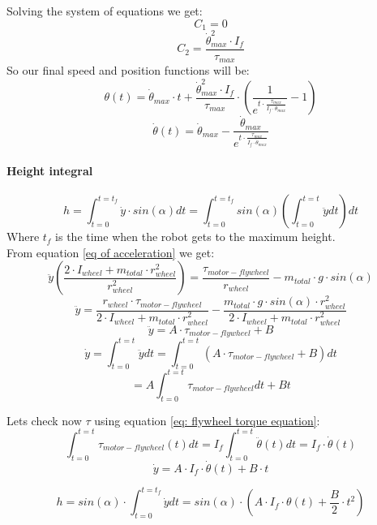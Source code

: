     Solving the system of equations we get:
    \begin{equation*}
        C_1
        =0
    \end{equation*}
    \begin{equation*}
        C_2
        =
        \frac{\dot{\theta}^2_{max}\cdot I_f}{\tau_{max}}
    \end{equation*}
    So our final speed and position functions will be:
    \begin{equation}
        \label{eq: theta(t)}
        \theta(t) =  
        \dot{\theta}_{max} \cdot t+
        \frac{\dot{\theta}^2_{max}\cdot I_f}{\tau_{max}} \cdot (\frac{1}
        {e^{t\cdot \frac{\tau_{max}}{I_f \cdot \dot{\theta}_{max}}}}-1)
    \end{equation}
    \begin{equation}
        \label{eq: dottheta(t)}
        \dot{\theta}(t) = \dot{\theta}_{max}
        - \frac{\dot{\theta}_{max}}
        {e^{t\cdot \frac{\tau_{max}}{I_f \cdot \dot{\theta}_{max}}}}
    \end{equation}
    \paragraph{Height integral}
    \[h=\int_{t=0}^{t=t_f} \dot{y}\cdot sin(\alpha) dt =\int_{t=0}^{t=t_f} sin(\alpha) (\int_{t=0}^{t=t} \ddot{y} dt)dt \]
    Where $t_f$ is the time when the robot gets to the maximum height.\\    
    From equation \ref{eq of acceleration} we get:
    \[\ddot{y}(\frac{2\cdot I_{wheel}+ m_{total} \cdot r^2_{wheel} }{r^2_{wheel}}) =  \frac{\tau_{motor-flywheel}}{r_{wheel}} - m_{total} \cdot g \cdot sin(\alpha)\]
    \[\ddot{y}=
    \frac{r_{wheel}\cdot\tau_{motor-flywheel}}{2\cdot I_{wheel}+ m_{total} \cdot r^2_{wheel}}
    - \frac{m_{total} \cdot g \cdot sin(\alpha)\cdot r^2_{wheel}}{2\cdot I_{wheel}+ m_{total} \cdot r^2_{wheel}}\]    \[\ddot{y}=A\cdot \tau_{motor-flywheel} + B\]
    \[\dot{y} =\int_{t=0}^{t=t} \ddot{y} dt = \int_{t=0}^{t=t} (A\cdot \tau_{motor-flywheel} + B) dt\]
    \[=A\int_{t=0}^{t=t} \tau_{motor-flywheel} dt + B t \]
  
Lets check now $\tau$ using equation \ref{eq: flywheel torque equation}:
    \[\int_{t=0}^{t=t} \tau_{motor-flywheel}(t) dt = 
    I_f\int_{t=0}^{t=t}\ddot{\theta}(t) dt= 
    I_f\cdot \dot{\theta}(t)\]
    \[\dot{y} =A\cdot I_f\cdot \dot{\theta}(t)+B\cdot t\]

    \[h=sin(\alpha)\cdot \int_{t=0}^{t=t_f} \dot{y} dt =sin(\alpha)\cdot (A\cdot I_f\cdot \theta(t)+\frac{B}{2}\cdot t^2)\]
    